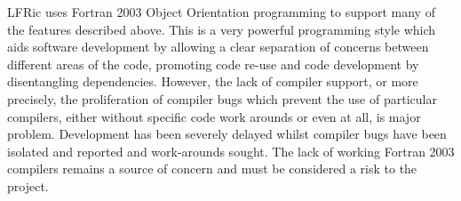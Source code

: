 \documentclass[11pt]{article}
\begin{document}
LFRic uses Fortran 2003 Object Orientation programming to support many of the
features described above. This is a very powerful programming
style which aids software development by allowing a clear separation
of concerns between different areas of the code, promoting code re-use
and code development by disentangling dependencies. However, the lack
of compiler support, or more precisely, the proliferation of compiler
bugs which prevent the use of particular compilers, either without specific
code work arounds or even at all, is major problem. Development has
been severely delayed whilst compiler bugs have been isolated and
reported and work-arounds sought. The lack of working Fortran 2003
compilers remains a source of concern and must be considered a risk to
the project.





\end{document}

